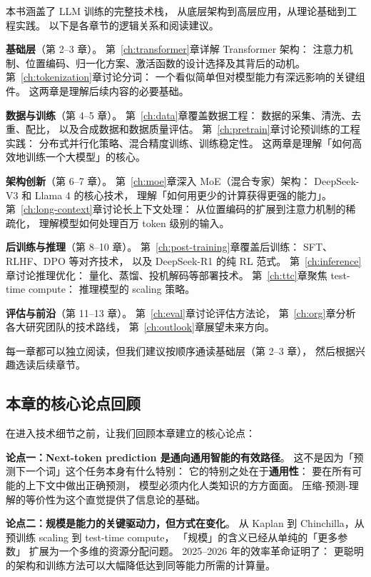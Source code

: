 本书涵盖了 LLM 训练的完整技术栈，
从底层架构到高层应用，从理论基础到工程实践。
以下是各章节的逻辑关系和阅读建议。

\textbf{基础层}（第 2--3 章）。
第~\ref{ch:transformer}章详解 Transformer 架构：
注意力机制、位置编码、归一化方案、激活函数的设计选择及其背后的动机。
第~\ref{ch:tokenization}章讨论分词：
一个看似简单但对模型能力有深远影响的关键组件。
这两章是理解后续内容的必要基础。

\textbf{数据与训练}（第 4--5 章）。
第~\ref{ch:data}章覆盖数据工程：
数据的采集、清洗、去重、配比，
以及合成数据和数据质量评估。
第~\ref{ch:pretrain}章讨论预训练的工程实践：
分布式并行化策略、混合精度训练、训练稳定性。
这两章是理解「如何高效地训练一个大模型」的核心。

\textbf{架构创新}（第 6--7 章）。
第~\ref{ch:moe}章深入 MoE（混合专家）架构：
DeepSeek-V3 和 Llama 4 的核心技术，
理解「如何用更少的计算获得更强的能力」。
第~\ref{ch:long-context}章讨论长上下文处理：
从位置编码的扩展到注意力机制的稀疏化，
理解模型如何处理百万 token 级别的输入。

\textbf{后训练与推理}（第 8--10 章）。
第~\ref{ch:post-training}章覆盖后训练：
SFT、RLHF、DPO 等对齐技术，
以及 DeepSeek-R1 的纯 RL 范式。
第~\ref{ch:inference}章讨论推理优化：
量化、蒸馏、投机解码等部署技术。
第~\ref{ch:ttc}章聚焦 test-time compute：
推理模型的 scaling 策略。

\textbf{评估与前沿}（第 11--13 章）。
第~\ref{ch:eval}章讨论评估方法论，
第~\ref{ch:org}章分析各大研究团队的技术路线，
第~\ref{ch:outlook}章展望未来方向。

每一章都可以独立阅读，但我们建议按顺序通读基础层（第 2--3 章），
然后根据兴趣选读后续章节。

\subsection{本章的核心论点回顾}

在进入技术细节之前，让我们回顾本章建立的核心论点：

\textbf{论点一：Next-token prediction 是通向通用智能的有效路径}。
这不是因为「预测下一个词」这个任务本身有什么特别：
它的特别之处在于\textbf{通用性}：
要在所有可能的上下文中做出正确预测，
模型必须内化人类知识的方方面面。
压缩-预测-理解的等价性为这个直觉提供了信息论的基础。

\textbf{论点二：规模是能力的关键驱动力，但方式在变化}。
从 Kaplan 到 Chinchilla，从预训练 scaling 到 test-time compute，
「规模」的含义已经从单纯的「更多参数」
扩展为一个多维的资源分配问题。
2025--2026 年的效率革命证明了：
更聪明的架构和训练方法可以大幅降低达到同等能力所需的计算量。

